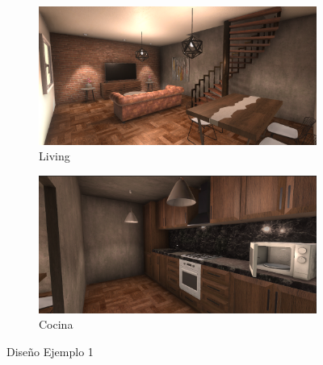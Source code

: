 \begin{figure}
     \centering
     \begin{subfigure}[b]{0.5\textwidth}
         \centering
         \includegraphics[width=\textwidth]{figs/1_1.png}
         \caption{Living}
         \label{1_1}
     \end{subfigure}
     \hfill
     \begin{subfigure}[b]{0.5\textwidth}
         \centering
         \includegraphics[width=\textwidth]{figs/1_2.png}
         \caption{Cocina}
         \label{1_2}
     \end{subfigure}
     \hfill
        \caption{Diseño Ejemplo 1}
        \label{diseno_1}
\end{figure}

